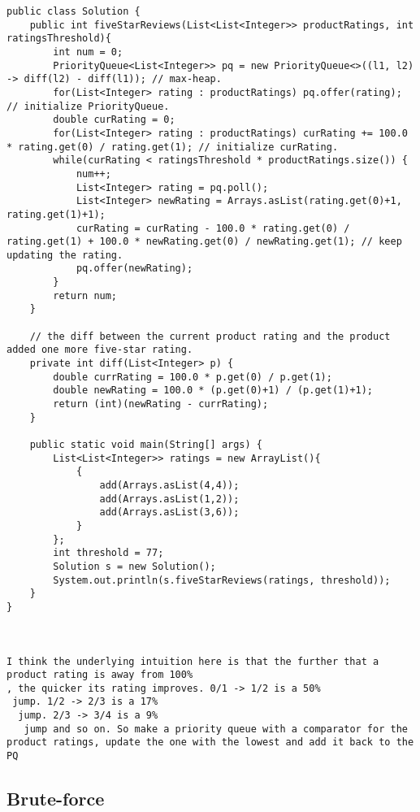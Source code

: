 \begin{verbatim}
public class Solution {
    public int fiveStarReviews(List<List<Integer>> productRatings, int ratingsThreshold){
        int num = 0;
        PriorityQueue<List<Integer>> pq = new PriorityQueue<>((l1, l2) -> diff(l2) - diff(l1)); // max-heap.
        for(List<Integer> rating : productRatings) pq.offer(rating); // initialize PriorityQueue.
        double curRating = 0;
        for(List<Integer> rating : productRatings) curRating += 100.0 * rating.get(0) / rating.get(1); // initialize curRating.
        while(curRating < ratingsThreshold * productRatings.size()) {
            num++;
            List<Integer> rating = pq.poll();
            List<Integer> newRating = Arrays.asList(rating.get(0)+1, rating.get(1)+1);
            curRating = curRating - 100.0 * rating.get(0) / rating.get(1) + 100.0 * newRating.get(0) / newRating.get(1); // keep updating the rating.
            pq.offer(newRating);
        }
        return num;
    }

    // the diff between the current product rating and the product added one more five-star rating.
    private int diff(List<Integer> p) {
        double currRating = 100.0 * p.get(0) / p.get(1);
        double newRating = 100.0 * (p.get(0)+1) / (p.get(1)+1);
        return (int)(newRating - currRating);
    }

    public static void main(String[] args) {
        List<List<Integer>> ratings = new ArrayList(){
            {
                add(Arrays.asList(4,4));
                add(Arrays.asList(1,2));
                add(Arrays.asList(3,6));
            }
        };
        int threshold = 77;
        Solution s = new Solution();
        System.out.println(s.fiveStarReviews(ratings, threshold));
    }
}



I think the underlying intuition here is that the further that a product rating is away from 100%
, the quicker its rating improves. 0/1 -> 1/2 is a 50%
 jump. 1/2 -> 2/3 is a 17%
  jump. 2/3 -> 3/4 is a 9%
   jump and so on. So make a priority queue with a comparator for the product ratings, update the one with the lowest and add it back to the PQ

\end{verbatim}
\subsection{Brute-force}
\label{five_starts_seller:sec:bruteforce}



